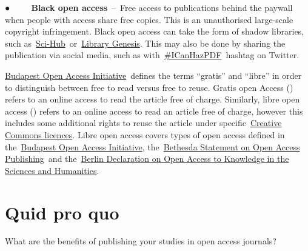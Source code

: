 \documentclass[
]{book}
\begin{document}
● ~ ~ ~\textbf{Black open access}~--~Free access to publications behind the paywall when people with access share free copies. This is an unauthorised large-scale copyright infringement. Black open access can take the form of shadow libraries, such as~\href{https://en.wikipedia.org/wiki/Sci-Hub}{}\href{https://en.wikipedia.org/wiki/Sci-Hub}{Sci-Hub}~or~\href{https://en.wikipedia.org/wiki/Library_Genesis}{}\href{https://en.wikipedia.org/wiki/Library_Genesis}{Library Genesis}. This may also be done by sharing the publication via social media, such as with~\href{https://en.wikipedia.org/wiki/ICanHazPDF}{}\href{https://en.wikipedia.org/wiki/ICanHazPDF}{\#ICanHazPDF}~hashtag on Twitter.

\href{https://www.budapestopenaccessinitiative.org/}{Budapest Open Access Initiative}~defines the terms ``gratis'' and ``libre'' in order to distinguish between free to read versus free to reuse. Gratis open Access () refers to an online access to read the article free of charge. Similarly, libre open access () refers to an online access to read an article free of charge, however this includes some additional rights to reuse the article under specific~\href{https://en.wikipedia.org/wiki/Creative_Commons_license}{}\href{https://en.wikipedia.org/wiki/Creative_Commons_license}{Creative Commons licences}. Libre open access covers types of open access defined in the~\href{https://en.wikipedia.org/wiki/Budapest_Open_Access_Initiative}{}\href{https://en.wikipedia.org/wiki/Budapest_Open_Access_Initiative}{Budapest Open Access Initiative}, the~\href{https://en.wikipedia.org/wiki/Bethesda_Statement_on_Open_Access_Publishing}{}\href{https://en.wikipedia.org/wiki/Bethesda_Statement_on_Open_Access_Publishing}{Bethesda Statement on Open Access Publishing}~and the~\href{https://en.wikipedia.org/wiki/Berlin_Declaration_on_Open_Access_to_Knowledge_in_the_Sciences_and_Humanities}{}\href{https://en.wikipedia.org/wiki/Berlin_Declaration_on_Open_Access_to_Knowledge_in_the_Sciences_and_Humanities}{Berlin Declaration on Open Access to Knowledge in the Sciences and Humanities}.

\hypertarget{quid-pro-quo}{%
\section{\texorpdfstring{\textbf{Quid pro quo}}{Quid pro quo}}\label{quid-pro-quo}}

What are the benefits of publishing your studies in open access journals?
\end{document}

